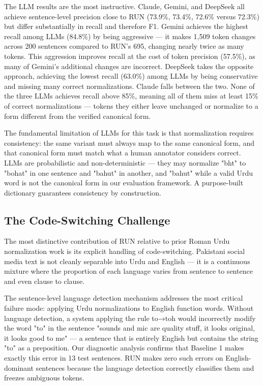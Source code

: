 \documentclass[11pt]{article}
\begin{document}
The LLM results are the most instructive. Claude, Gemini, and DeepSeek all achieve sentence-level precision close to RUN (73.9\%, 73.4\%, 72.6\% versus 72.3\%) but differ substantially in recall and therefore F1. Gemini achieves the highest recall among LLMs (84.8\%) by being aggressive — it makes 1,509 token changes across 200 sentences compared to RUN's 695, changing nearly twice as many tokens. This aggression improves recall at the cost of token precision (57.5\%), as many of Gemini's additional changes are incorrect. DeepSeek takes the opposite approach, achieving the lowest recall (63.0\%) among LLMs by being conservative and missing many correct normalizations. Claude falls between the two. None of the three LLMs achieves recall above 85\%, meaning all of them miss at least 15\% of correct normalizations — tokens they either leave unchanged or normalize to a form different from the verified canonical form.

The fundamental limitation of LLMs for this task is that normalization requires consistency: the same variant must always map to the same canonical form, and that canonical form must match what a human annotator considers correct. LLMs are probabilistic and non-deterministic — they may normalize "bht" to "bohat" in one sentence and "bahut" in another, and "bahut" while a valid Urdu word is not the canonical form in our evaluation framework. A purpose-built dictionary guarantees consistency by construction.


\subsection{The Code-Switching Challenge}
The most distinctive contribution of RUN relative to prior Roman Urdu normalization work is its explicit handling of code-switching. Pakistani social media text is not cleanly separable into Urdu and English — it is a continuous mixture where the proportion of each language varies from sentence to sentence and even clause to clause.

The sentence-level language detection mechanism addresses the most critical failure mode: applying Urdu normalizations to English function words. Without language detection, a system applying the rule to→toh would incorrectly modify the word "to" in the sentence "sounds and mic are quality stuff, it looks original, it looks good to me" — a sentence that is entirely English but contains the string "to" as a preposition. Our diagnostic analysis confirms that Baseline 1 makes exactly this error in 13 test sentences. RUN makes zero such errors on English-dominant sentences because the language detection correctly classifies them and freezes ambiguous tokens.
\end{document}
